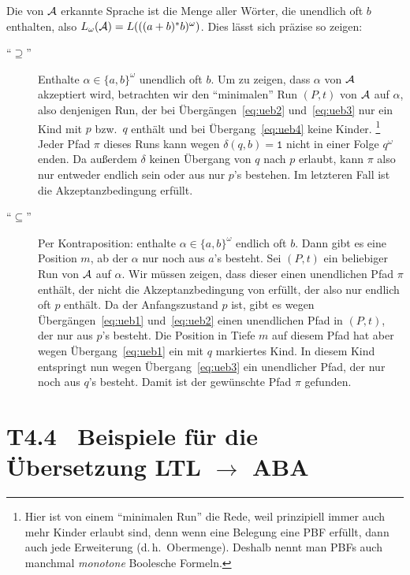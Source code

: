 \documentclass[fontsize=11pt, twoside=false, numbers=autoenddot]{scrbook}
\begin{document}
Die von $\mathcal{A}$ erkannte Sprache ist die Menge aller Wörter,
die unendlich oft $b$ enthalten,
also $L_\omega(\mathcal{A}) = L(((a+b)^*b)^\omega)$.
Dies lässt sich präzise so zeigen:
%
\begin{description}
  \item[{\boldmath"`$\supseteq$"'}]
    Enthalte $\alpha \in \{a,b\}^\omega$ unendlich oft $b$.
    Um zu zeigen, dass $\alpha$ von $\mathcal{A}$ akzeptiert wird,
    betrachten wir den "`minimalen"' Run $(P,t)$ von $\mathcal{A}$ auf $\alpha$,
    also denjenigen Run, der bei Übergängen~\eqref{eq:ueb2} und~\eqref{eq:ueb3}
    nur ein Kind mit $p$ bzw.\ $q$ enthält
    und bei Übergang~\eqref{eq:ueb4} keine Kinder.%
    \footnote{Hier ist von einem "`minimalen Run"' die Rede,
    weil prinzipiell immer auch mehr Kinder erlaubt sind,
    denn wenn eine Belegung eine PBF erfüllt,
    dann auch jede Erweiterung (d.\,h.\ Obermenge).
    Deshalb nennt man PBFs auch manchmal \emph{monotone} Boolesche Formeln.}
    Jeder Pfad $\pi$ dieses Runs kann
    wegen $\delta(q,b) = \texttt{1}$ nicht in einer Folge $q^\omega$ enden.
    Da außerdem $\delta$ keinen Übergang von $q$ nach $p$ erlaubt,
    kann $\pi$ also nur entweder endlich sein oder aus nur $p$'s bestehen.
    Im letzteren Fall ist die Akzeptanzbedingung erfüllt.
    \par\smallskip
  \item[{\boldmath"`$\subseteq$"'}]
    Per Kontraposition:
    enthalte $\alpha \in \{a,b\}^\omega$ endlich oft $b$.
    Dann gibt es eine Position $m$,
    ab der $\alpha$ nur noch aus $a$'s besteht.
    Sei $(P,t)$ ein beliebiger Run von $\mathcal{A}$ auf $\alpha$.
    Wir müssen zeigen, dass dieser einen unendlichen Pfad $\pi$
    enthält, der nicht die Akzeptanzbedingung von \Amc erfüllt,
    der also nur endlich oft $p$ enthält.
    Da der Anfangszustand $p$ ist,
    gibt es wegen Übergängen~\eqref{eq:ueb1} und~\eqref{eq:ueb2} einen
    unendlichen Pfad in $(P,t)$, der nur aus $p$'s besteht.
    Die Position in Tiefe $m$ auf diesem Pfad 
    hat aber wegen Übergang~\eqref{eq:ueb1} ein mit $q$ markiertes Kind.
    In diesem Kind entspringt nun wegen Übergang~\eqref{eq:ueb3}
    ein unendlicher Pfad, der nur noch aus $q$'s besteht.
    Damit ist der gewünschte Pfad $\pi$ gefunden.
\end{description}

\section*{T4.4~ Beispiele für die Übersetzung {\boldmath LTL $\to$ ABA}}
\end{document}

